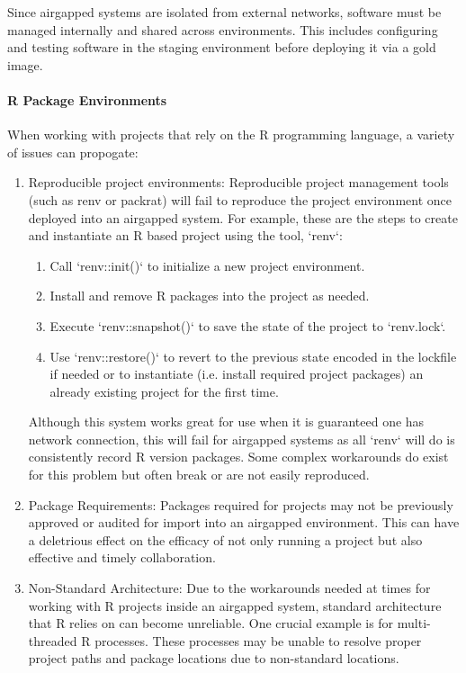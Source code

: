 \documentclass{amia}
\begin{document}
Since airgapped systems are isolated from external networks, software must be managed internally and shared across environments. This includes configuring and testing software in the staging environment before deploying it via a gold image. 

\paragraph{R Package Environments}

When working with projects that rely on the R programming language, a variety of issues can propogate:

\begin{enumerate}
	\item Reproducible project environments: Reproducible project management tools (such as renv or packrat) will fail to reproduce the project environment once deployed into an airgapped system. For example, these are the steps to create and instantiate an R based project using the tool, `renv`:
		\begin{enumerate}
			\item Call `renv::init()` to initialize a new project environment.

			\item Install and remove R packages into the project as needed.

			\item Execute `renv::snapshot()` to save the state of the project to `renv.lock`.

			\item Use `renv::restore()` to revert to the previous state encoded in the lockfile if needed or to instantiate (i.e. install required project packages) an already existing project for the first time.
		\end{enumerate}
	Although this system works great for use when it is guaranteed one has network connection, this will fail for airgapped systems as all `renv` will do is consistently record R version packages. Some complex workarounds do exist for this problem but often break or are not easily reproduced. 
	\item Package Requirements: Packages required for projects may not be previously approved or audited for import into an airgapped environment. This can have a deletrious effect on the efficacy of not only running a project but also effective and timely collaboration. 
	\item Non-Standard Architecture: Due to the workarounds needed at times for working with R projects inside an airgapped system, standard architecture that R relies on can become unreliable. One crucial example is for multi-threaded R processes. These processes may be unable to resolve proper project paths and package locations due to non-standard locations.
\end{enumerate}
\end{document}
